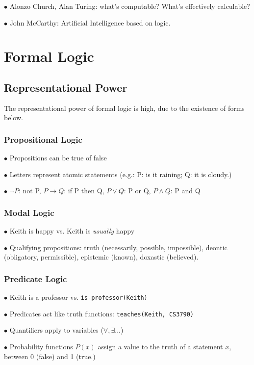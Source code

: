 \documentclass[english,openany]{book}
\begin{document}
$\bullet$ Alonzo Church, Alan Turing: what's computable? What's effectively calculable?

$\bullet$ John McCarthy: Artificial Intelligence based on logic.

\section{Formal Logic}

\subsection{Representational Power}

The representational power of formal logic is high, due to the existence of forms below.

\subsubsection{Propositional Logic}

$\bullet$ Propositions can be true of false

$\bullet$ Letters represent atomic statements (e.g.: P: is it raining; Q: it is cloudy.)

$\bullet$ $\neg P$: not P, $P \rightarrow Q$: if P then Q, $P \lor Q$: P or Q, $P \wedge Q$: P and Q

\subsubsection{Modal Logic}

$\bullet$ Keith is happy vs. Keith is \textit{usually} happy

$\bullet$ Qualifying propositions: truth (necessarily, possible, impossible), deontic (obligatory, permissible), epistemic (known), doxastic (believed).

\subsubsection{Predicate Logic}

$\bullet$ Keith is a professor vs. \texttt{is-professor(Keith)}

$\bullet$ Predicates act like truth functions: \texttt{teaches(Keith, CS3790)}

$\bullet$ Quantifiers apply to variables ($\forall, \exists...$)

$\bullet$ Probability functions $P(x)$ assign a value to the truth of a statement $x$, between 0 (false) and 1 (true.)
\end{document}
